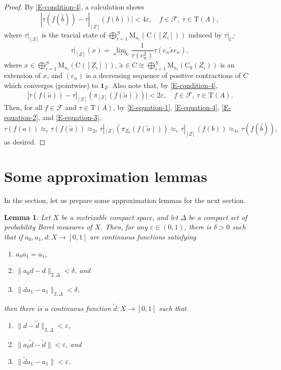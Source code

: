 \documentclass[12pt, oneside, psamsfonts]{amsart}
\newtheorem{lem}[thm]{Lemma}
\theoremstyle{definition}
\theoremstyle{remark}
\numberwithin{equation}{section}
\newcommand{\norm}[1]{\| #1\|}
\newcommand{\abs}[1]{| #1 |}
\newcommand{\eps}{\varepsilon}
\newcommand{\tr}{\mathrm{T}}
\begin{document}
\begin{proof}
By \eqref{E-condition-4}, a calculation shows 
\begin{equation}\label{E-equation-3}
 \abs{\tau(f(\hat{b})) - \tau|_{[Z]}(f(b))} < 4 \eps,\quad f\in \mathcal F,\  \tau \in \tr(A),
 \end{equation}
where $\tau|_{[Z]}$ is the tracial state of $\bigoplus_{i=1}^S \mathrm{M}_{n_i}(\mathrm{C}([Z_i]))$ %
induced by $\tau|_C$:
$$\tau|_{[Z]}(x) = \lim_{n \to\infty}\frac{1}{\tau(e^2_n)} \tau(e_n \tilde{x} e_n), 
$$
where $x \in \bigoplus_{i=1}^S \mathrm{M}_{n_i}(\mathrm{C}([Z_i]))$, $\tilde{x} \in C \cong  \bigoplus_{i=1}^S \mathrm{M}_{n_i}(\mathrm{C}_0(Z_i))$ is an extension of $x$, and $(e_n)$ is a decreasing sequence of positive contractions of $C$ which converges (pointwise) to $\mathbf{1}_{Z}$. Also note that, by \eqref{E-condition-4},
\begin{equation}\label{E-equation-4}
\abs{\tau(f(\tilde{a})) - \tau|_{[Z]}(\pi_{[Z]}(f(\tilde{a})))} < 2\eps,\quad f \in \mathcal F,\  \tau \in \tr(A).
\end{equation}
Then, for all $f \in \mathcal F$ and $\tau \in \tr(A)$, by \eqref{E-equation-1}, \eqref{E-equation-4}, \eqref{E-equation-2}, and \eqref{E-equation-3}, 
$$ \tau(f(a)) \approx_\eps \tau(f(\tilde{a})) \approx_{2\eps} \tau|_{[Z]}(\pi_{Z_0}(f(\tilde{a}))) \approx_{\eps} \tau|_{[Z]}(f(b)) \approx_{4\eps} \tau(f(\hat{b})),$$
as desired. 
\end{proof}





\section{Some approximation lemmas}
In the section, let us prepare some approximation lemmas for the next section.

\begin{lem}\label{tr-to-norm-red}
Let $X$ be a metrizable compact space, and let $\Delta$ be a compact set of probability Borel measures of $X$. Then, for any $\eps \in (0, 1)$, there is $\delta>0$ such that if $a_0, a_1, d: X \to [0, 1]$ are continuous functions satisfying
\begin{enumerate}
\item $a_0a_1 = a_1$,
\item $\norm{a_0 d - d}_{2, \Delta} < \delta$, and
\item $\norm{da_1 - a_1}_{2, \Delta} < \delta$,
\end{enumerate}
then there is a continuous function $\tilde{d}: X \to [0, 1]$ such that
\begin{enumerate}
\item $\norm{d - \tilde{d}}_{2, \Delta} < \eps$,
\item $\norm{a_0 \tilde{d} - \tilde{d}} < \eps$, and
\item $\norm{\tilde{d} a_1 - a_1} < \eps$.
\end{enumerate}
\end{lem}
\end{document}
